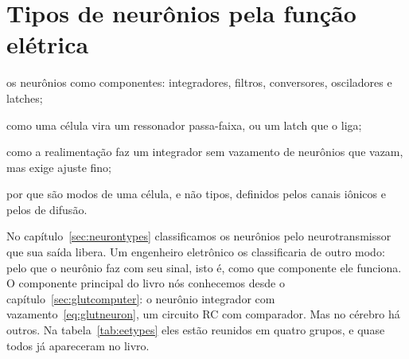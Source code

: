 \chapter{Tipos de neurônios pela função elétrica}
\label{sec:eetypes}
\begin{chaptergoals}
\item os neurônios como componentes: integradores, filtros, conversores, osciladores e latches;
\item como uma célula vira um ressonador passa-faixa, ou um latch que o  liga;
\item como a realimentação faz um integrador sem vazamento de neurônios que vazam, mas exige ajuste fino;
\item por que são modos de uma célula, e não tipos, definidos pelos canais iônicos e pelos de difusão.
\end{chaptergoals}

No capítulo~\ref{sec:neurontypes} classificamos os neurônios pelo neurotransmissor que sua saída libera. Um engenheiro eletrônico os classificaria de outro modo: pelo que o neurônio faz com seu sinal, isto é, como que componente ele funciona. O componente principal do livro nós conhecemos desde o capítulo~\ref{sec:glutcomputer}: o neurônio integrador com vazamento~\eqref{eq:glutneuron}, um circuito RC com comparador. Mas no cérebro há outros. Na tabela~\ref{tab:eetypes} eles estão reunidos em quatro grupos, e quase todos já apareceram no livro.

